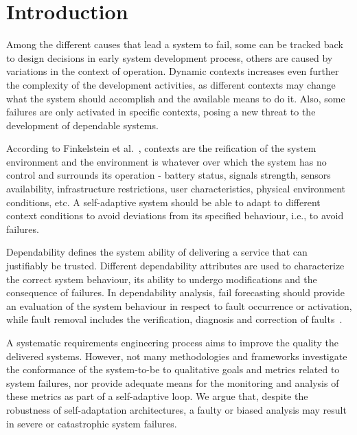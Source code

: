 \chapter{Introduction}\label{ch_introduction}%

Among the different causes that lead a system to fail, some can be tracked back to design decisions in early system development process, others are caused by variations in the context of operation. Dynamic contexts increases even further the complexity of the development activities, as different contexts may change what the system should accomplish and the available means to do it. Also, some failures are only activated in specific contexts, posing a new threat to the development of dependable systems.

According to Finkelstein et al.~\cite{Andrea01aframework}, contexts are the reification of the system environment and the environment is whatever over which the system has no control and surrounds its operation - battery status, signals strength, sensors availability, infrastructure restrictions, user characteristics, physical environment conditions, etc. A self-adaptive system should be able to adapt to different context conditions to avoid deviations from its specified behaviour, i.e., to avoid failures.

Dependability defines the system ability of delivering a service that can justifiably be trusted. Different dependability attributes are used to characterize the correct system behaviour, its ability to undergo modifications and the consequence of failures. In dependability analysis, fail forecasting should provide an evaluation of the system behaviour in respect to fault occurrence or activation, while fault removal includes the verification, diagnosis and correction of faults~\cite{Laprie2004}. 

A systematic requirements engineering process aims to improve the quality the delivered systems. However, not many methodologies and frameworks investigate the conformance of the system-to-be to qualitative goals and metrics related to system failures, nor provide adequate means for the monitoring and analysis of these metrics as part of a self-adaptive loop. We argue that, despite the robustness of self-adaptation architectures, a faulty or biased analysis may result in severe or catastrophic system failures.




